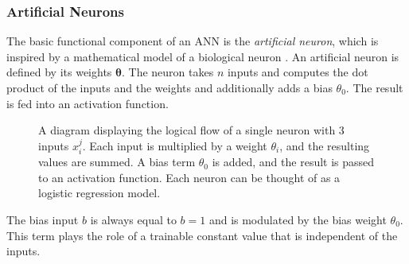 \subsubsection{Artificial Neurons}

The basic functional component of an ANN is the \textit{artificial neuron}, which is inspired by a mathematical model of a biological neuron \cite{mcculloch1943logical, hopfield1987neural}.
An artificial neuron is defined by its weights $\bm{\theta}$.
The neuron takes $n$ inputs and computes the dot product of the inputs and the weights and additionally adds a bias $\theta_0$.
The result is fed into an activation function.

\begin{figure}[!htbp]
    \centering
    
    \caption{
      A diagram displaying the logical flow of a single neuron with 3 inputs $x_i^j$.
      Each input is multiplied by a weight $\theta_i$, and the resulting values are summed.
      A bias term $\theta_0$ is added, and the result is passed to an activation function.
      Each neuron can be thought of as a logistic regression model.
    }
    \label{fig:neuron}
\end{figure}

The bias input $b$ is always equal to $b = 1$ and is modulated by the bias weight $\theta_0$. This term plays the role of a trainable constant value that is independent of the inputs.




